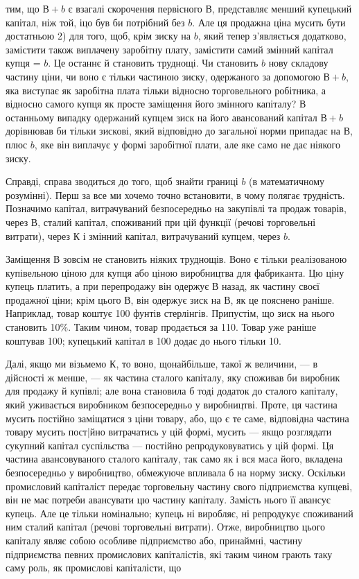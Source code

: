 \parcont{}  %
тим, що $В + b$ є взагалі скорочення первісного $В$, представляє
менший купецький капітал, ніж той, іцо був би потрібний без $b$.
Але ця продажна ціна мусить бути достатньою 2) для того, щоб,
крім зиску на $b$, який тепер з’являється додатково, замістити також
виплачену заробітну плату, замістити самий змінний капітал
купця = $b$. Це останнє й становить труднощі. Чи становить $b$
нову складову частину ціни, чи воно є тільки частиною зиску,
одержаного за допомогою $В + b$, яка виступає як заробітна плата
тільки відносно торговельного робітника, а відносно самого
купця як просте заміщення його змінного капіталу? В останньому
випадку одержаний купцем зиск на його авансований капітал
$В + b$ дорівнював би тільки зискові, який відповідно до загальної
норми припадає на $В$, плюс $b$, яке він виплачує у формі
заробітної плати, але яке само не дає ніякого зиску.

Справді, справа зводиться до того, щоб знайти границі $b$ (в математичному
розумінні). Перш за все ми хочемо точно встановити,
в чому полягає трудність. Позначимо капітал, витрачуваний безпосередньо
на закупівлі та продаж товарів, через $В$, сталий капітал,
споживаний при цій функції (речові торговельні витрати),
через $К$ і змінний капітал, витрачуваний купцем, через $b$.

Заміщення $В$ зовсім не становить ніяких труднощів. Воно є
тільки реалізованою купівельною ціною для купця або ціною
виробництва для фабриканта. Цю ціну купець платить, а при
перепродажу він одержує $В$ назад, як частину своєї продажної
ціни; крім цього $В$, він одержує зиск на $В$, як це пояснено раніше.
Наприклад, товар коштує 100 фунтів стерлінгів. Припустім, що зиск
на нього становить 10\%. Таким чином, товар продається за
110. Товар уже раніше коштував 100; купецький капітал в 100
додає до нього тільки 10.

Далі, якщо ми візьмемо $К$, то воно, щонайбільше, такої ж
величини, — в дійсності ж менше, — як частина сталого капіталу,
яку споживав би виробник для продажу й купівлі; але вона становила
б тоді додаток до сталого капіталу, який уживається виробником
безпосередньо у виробництві. Проте, ця частина мусить
постійно заміщатися з ціни товару, або, що є те саме, відповідна
частина товару мусить пост|йно витрачатись у цій формі, мусить
— якщо розглядати сукупний капітал суспільства — постійно
репродуковуватись у цій формі. Ця частина авансовуваного сталого
капіталу, так само як і вся маса його, вкладена безпосередньо
у виробництво, обмежуюче впливала б на норму зиску. Оскільки
промисловий капіталіст передає торговельну частину свого підприємства
купцеві, він не має потреби авансувати цю частину
капіталу. Замість нього її авансує купець. Але це тільки номінально;
купець ні виробляє, ні репродукує споживаний ним сталий
капітал (речові торговельні витрати). Отже, виробництво
цього капіталу являє собою особливе підприємство або, принаймні,
частину підприємства певних промислових капіталістів, які таким
чином грають таку саму роль, як промислові капіталісти, що
\parbreak{}  %
